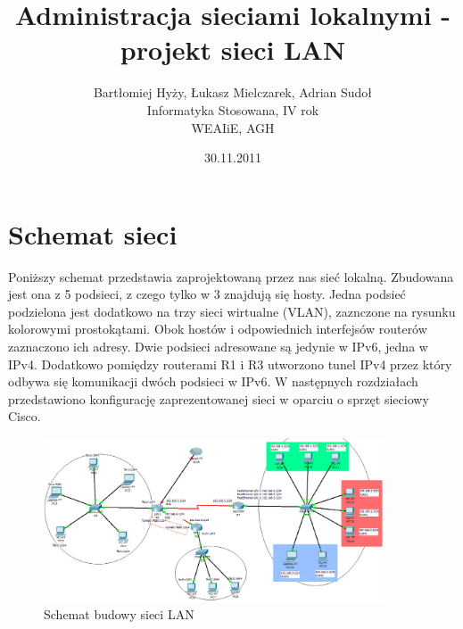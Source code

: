 \documentclass[polish,11pt,a4paper,twoside]{article}
\begin{document}
\pagestyle{fancy}
\fancyhf{} %
\fancyfoot[R]{\footnotesize \thepage}
\renewcommand{\headrulewidth}{0pt}
\renewcommand{\footrulewidth}{0pt}

\author{Bartłomiej Hyży, Łukasz Mielczarek, Adrian Sudoł\\Informatyka Stosowana, IV rok\\WEAIiE, AGH}
\date{30.11.2011}
\title{Administracja sieciami lokalnymi -\\projekt sieci LAN}
\maketitle

\tableofcontents
\pagebreak

\thispagestyle{fancy}

\section{Schemat sieci}
Poniższy schemat przedstawia zaprojektowaną przez nas sieć lokalną. Zbudowana jest ona z 5 podsieci, z czego tylko w 3 znajdują się hosty. Jedna podsieć podzielona jest dodatkowo na trzy sieci wirtualne (VLAN), zaznczone na rysunku kolorowymi prostokątami. Obok hostów i odpowiednich interfejsów routerów zaznaczono ich adresy. Dwie podsieci adresowane są jedynie w IPv6, jedna w IPv4. Dodatkowo pomiędzy routerami R1 i R3 utworzono tunel IPv4 przez który odbywa się komunikacji dwóch podsieci w IPv6. W następnych rozdziałach przedstawiono konfigurację zaprezentowanej sieci w oparciu o sprzęt sieciowy Cisco.
\begin{figure}[!htb]
  \begin{center}
    \includegraphics[width=0.9\textwidth]{schemat.png}
    \caption{Schemat budowy sieci LAN} \label{fig:schemat} 
  \end{center}
\end{figure}
\end{document}
